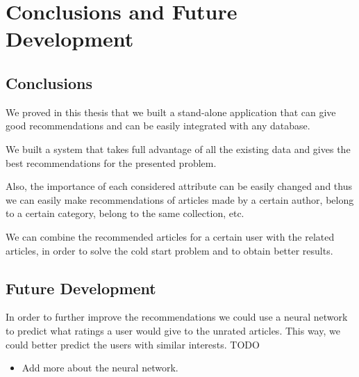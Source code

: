 \chapter{Conclusions and Future Development}
\label{chapter:conclusions-future-development}

\section{Conclusions} 
\label{sec:conclusions}
We proved in this thesis that we built a stand-alone application that can give good recommendations and can be easily integrated with any database.

We built a system that takes full advantage of all the existing data and gives the best recommendations for the presented problem.

Also, the importance of each considered attribute can be easily changed and thus we can easily make recommendations of articles made by a certain author, belong to a certain category, belong to the same collection, etc. 

We can combine the recommended articles for a certain user with the related articles, in order to solve the cold start problem and to obtain better results.

\section{Future Development} 
\label{sec:future-development}

In order to further improve the recommendations we could use a neural network to predict what ratings a user would give to the unrated articles\cite{netflix-recommender}. This way, we could better predict the users with similar interests.
TODO
\begin{itemize}
	\item Add more about the neural network.	
\end{itemize}
